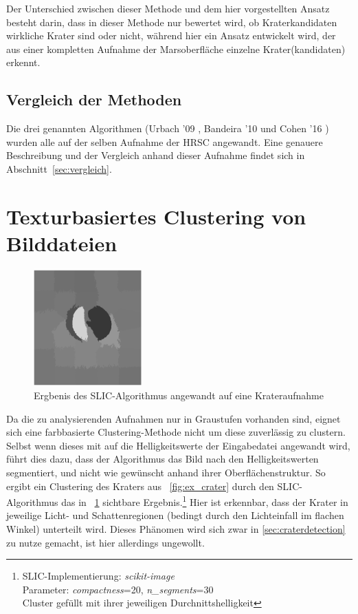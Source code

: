 Der Unterschied zwischen dieser Methode und dem hier vorgestellten Ansatz besteht darin, dass in dieser Methode nur bewertet wird, ob Kraterkandidaten wirkliche Krater sind oder nicht, während hier ein Ansatz entwickelt wird, der aus einer kompletten Aufnahme der Marsoberfläche einzelne Krater(kandidaten) erkennt.

\subsection{Vergleich der Methoden}
\label{ssec:vergleich}

Die drei genannten Algorithmen (Urbach '09 \cite{urbach_stepinski_2009}, Bandeira '10 \cite{bandeira_10} und Cohen '16 \cite{cohen_16}) wurden alle auf der selben Aufnahme der HRSC angewandt. Eine genauere Beschreibung und der Vergleich anhand dieser Aufnahme findet sich in Abschnitt~\ref{sec:vergleich}.


\section{Texturbasiertes Clustering von Bilddateien}
\label{sec:clustering}


\begin{figure}
	\centering
	\includegraphics[width=0.37\textwidth,keepaspectratio]{images/gen/GEN_slic_crater.png}
	\captionsetup{format=plain}
	\caption{Ergbenis des SLIC-Algorithmus angewandt auf eine Krateraufnahme}
	\label{fig:slic_crater}
\end{figure}

Da die zu analysierenden Aufnahmen nur in Graustufen vorhanden sind, eignet sich eine farbbasierte Clustering-Methode nicht um diese zuverlässig zu clustern. Selbst wenn dieses mit auf die Helligkeitswerte der Eingabedatei angewandt wird, führt dies dazu, dass der Algorithmus das Bild nach den Helligkeitswerten segmentiert, und nicht wie gewünscht anhand ihrer Oberflächenstruktur. So ergibt ein Clustering des Kraters aus \figurename~\ref{fig:ex_crater} durch den SLIC-Algorithmus \cite{achanta_10} das in \figurename~\ref{fig:slic_crater} sichtbare Ergebnis.\footnote{SLIC-Implementierung: \textit{scikit-image}\\Parameter: \textit{compactness}=20, \textit{n\_segments}=30\\Cluster gefüllt mit ihrer jeweiligen Durchnittshelligkeit} Hier ist erkennbar, dass der Krater in jeweilige Licht- und Schattenregionen (bedingt durch den Lichteinfall im flachen Winkel) unterteilt wird. Dieses Phänomen wird sich zwar in \ref{sec:craterdetection} zu nutze gemacht, ist hier allerdings ungewollt.

